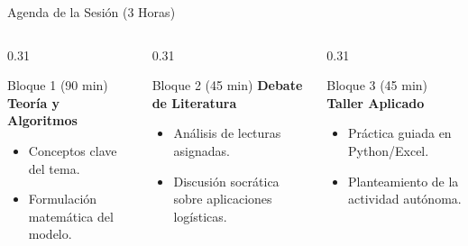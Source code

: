 \documentclass[aspectratio=169, 10pt]{beamer}
\begin{document}
\begin{frame}{Agenda de la Sesión (3 Horas)}
    \begin{columns}[T]
        \begin{column}{0.31\textwidth}
            \begin{block}{Bloque 1 (90 min)}
                \textbf{Teoría y Algoritmos}
                \begin{itemize}
                    \scriptsize
                    \item Conceptos clave del tema.
                    \item Formulación matemática del modelo.
                \end{itemize}
            \end{block}
        \end{column}
        
        \begin{column}{0.31\textwidth}
            \begin{exampleblock}{Bloque 2 (45 min)}
                \textbf{Debate de Literatura}
                \begin{itemize}
                    \scriptsize
                    \item Análisis de lecturas asignadas.
                    \item Discusión socrática sobre aplicaciones logísticas.
                \end{itemize}
            \end{exampleblock}
        \end{column}
        
        \begin{column}{0.31\textwidth}
            \begin{alertblock}{Bloque 3 (45 min)}
                \textbf{Taller Aplicado}
                \begin{itemize}
                    \scriptsize
                    \item Práctica guiada en Python/Excel.
                    \item Planteamiento de la actividad autónoma.
                \end{itemize}
            \end{alertblock}
        \end{column}
    \end{columns}
\end{frame}
\end{document}
